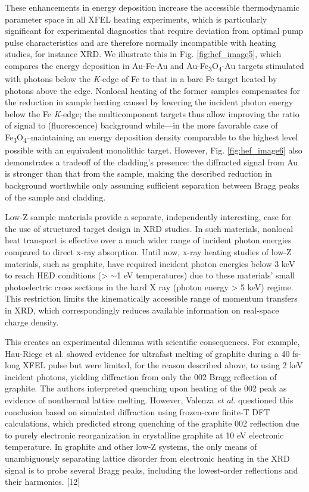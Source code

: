 These enhancements in energy deposition increase the accessible
thermodynamic parameter space in all XFEL heating experiments, which is
particularly significant for experimental diagnostics that require
deviation from optimal pump pulse characteristics and are therefore
normally incompatible with heating studies, for instance XRD. We
illustrate this in Fig. \ref{fig:hef_image5}, which compares the energy deposition in
Au-Fe-Au and Au-Fe\textsubscript{3}O\textsubscript{4}-Au targets
stimulated with photons below the \emph{K}-edge of Fe to that in a bare
Fe target heated by photons above the edge. Nonlocal heating of the
former samples compensates for the reduction in sample heating caused by
lowering the incident photon energy below the Fe \emph{K}-edge; the
multicomponent targets thus allow improving the ratio of signal to
(fluorescence) background while---in the more favorable case of
Fe\textsubscript{3}O\textsubscript{4}--maintaining an energy deposition
density comparable to the highest level possible with an equivalent
monolithic target. However, Fig. \ref{fig:hef_image6} also demonstrates a tradeoff of the
cladding's presence: the diffracted signal from Au is stronger than that
from the sample, making the described reduction in background worthwhile
only assuming sufficient separation between Bragg peaks of the sample
and cladding.

Low-Z sample materials provide a separate, independently interesting,
case for the use of structured target design in XRD studies. In such
materials, nonlocal heat transport is effective over a much wider range
of incident photon energies compared to direct x-ray absorption. Until
now, x-ray heating studies of low-Z materials, such as graphite, have
required incident photon energies below 3 keV to reach HED conditions
(\textgreater{} $\sim$1 eV temperatures) due to these
materials' small photoelectric cross sections in the hard X ray (photon
energy \textgreater{} 5 keV) regime. This restriction limits the
kinematically accessible range of momentum transfers in XRD, which
correspondingly reduces available information on real-space charge
density.

This creates an experimental dilemma with scientific consequences. For
example, Hau-Riege et al.\cite{HAU2012ULTRAFAST} showed evidence for ultrafast melting
of graphite during a 40 fs-long XFEL pulse but were limited, for the
reason described above, to using 2 keV incident photons, yielding
diffraction from only the 002 Bragg reflection of graphite. The authors
interpreted quenching upon heating of the 002 peak as evidence of
nonthermal lattice melting. However, Valenza \emph{et al.}\cite{VALENZA2016WARM}
questioned this conclusion based on simulated diffraction using
frozen-core finite-T DFT calculations, which predicted strong quenching
of the graphite 002 reflection due to purely electronic reorganization
in crystalline graphite at 10 eV electronic temperature. In graphite and
other low-Z systems, the only means of unambiguously separating lattice
disorder from electronic heating in the XRD signal is to probe several
Bragg peaks, including the lowest-order reflections and their harmonics.
{[}12{]}

